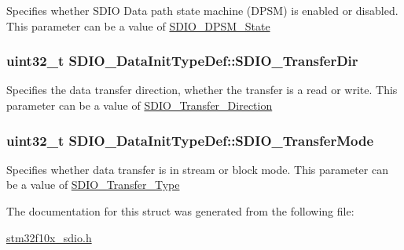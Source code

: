 \label{structSDIO__DataInitTypeDef_ad5eb5f3c6fd9e5d4a6664c5cf57d6b03}
Specifies whether SDIO Data path state machine (DPSM) is enabled or disabled. This parameter can be a value of \hyperlink{group__SDIO__DPSM__State}{SDIO\_\-DPSM\_\-State} \hypertarget{structSDIO__DataInitTypeDef_a4838fffdb3f87850569dff12f15485db}{
\subsubsection[{SDIO\_\-TransferDir}]{\setlength{\rightskip}{0pt plus 5cm}uint32\_\-t {\bf SDIO\_\-DataInitTypeDef::SDIO\_\-TransferDir}}}
\label{structSDIO__DataInitTypeDef_a4838fffdb3f87850569dff12f15485db}
Specifies the data transfer direction, whether the transfer is a read or write. This parameter can be a value of \hyperlink{group__SDIO__Transfer__Direction}{SDIO\_\-Transfer\_\-Direction} \hypertarget{structSDIO__DataInitTypeDef_a58ac19aaaceb2791d4bbcd30f334dd21}{
\subsubsection[{SDIO\_\-TransferMode}]{\setlength{\rightskip}{0pt plus 5cm}uint32\_\-t {\bf SDIO\_\-DataInitTypeDef::SDIO\_\-TransferMode}}}
\label{structSDIO__DataInitTypeDef_a58ac19aaaceb2791d4bbcd30f334dd21}
Specifies whether data transfer is in stream or block mode. This parameter can be a value of \hyperlink{group__SDIO__Transfer__Type}{SDIO\_\-Transfer\_\-Type} 

The documentation for this struct was generated from the following file:\begin{DoxyCompactItemize}
\item 
\hyperlink{stm32f10x__sdio_8h}{stm32f10x\_\-sdio.h}\end{DoxyCompactItemize}
